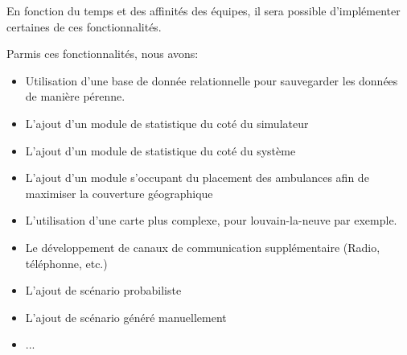 En fonction du temps et des affinités des équipes, il sera possible d'implémenter
certaines de ces fonctionnalités.

Parmis ces fonctionnalités, nous avons:
\begin{itemize}
	\item Utilisation d'une base de donnée relationnelle pour sauvegarder les 
		  données de manière pérenne.
	\item L'ajout d'un module de statistique du coté du simulateur
	\item L'ajout d'un module de statistique du coté du système
	\item L'ajout d'un module s'occupant du placement des ambulances
		  afin de maximiser la couverture géographique
	\item L'utilisation d'une carte plus complexe, pour louvain-la-neuve par
		  exemple.
	\item Le développement de canaux de communication supplémentaire (Radio, 
	      téléphonne, etc.)
	\item L'ajout de scénario probabiliste
	\item L'ajout de scénario généré manuellement
	\item ...
\end{itemize}
